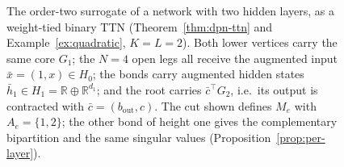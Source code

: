 \documentclass[11pt]{article}
\newcommand{\R}{\mathbb{R}}
\theoremstyle{definition}
\numberwithin{equation}{section}
\begin{document}
\begin{figure}[t]
\centering
{}
\caption{The order-two surrogate of a network with two hidden layers, as a weight-tied binary TTN (Theorem~\ref{thm:dpn-ttn} and Example~\ref{ex:quadratic}, $K=L=2$). Both lower vertices carry the same core $G_1$; the $N=4$ open legs all receive the augmented input $\bar x=(1,x)\in H_0$; the bonds carry augmented hidden states $\bar h_1\in H_1=\R\oplus\R^{d_1}$; and the root carries $\bar c^\top G_2$, i.e.\ its output is contracted with $\bar c=(b_{\mathrm{out}},c)$. The cut shown defines $M_e$ with $A_e=\{1,2\}$; the other bond of height one gives the complementary bipartition and the same singular values (Proposition~\ref{prop:per-layer}).}
\label{fig:quadratic}
\end{figure}
\end{document}
